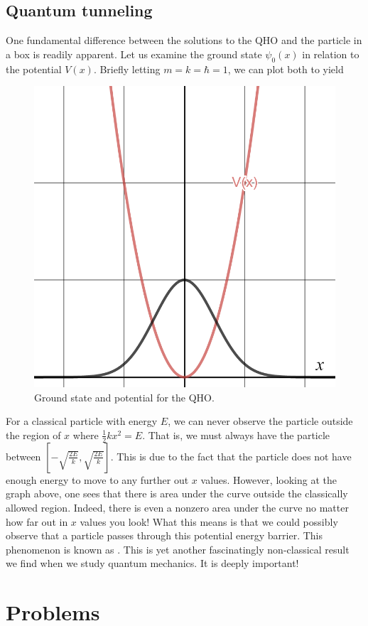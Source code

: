 \subsection{Quantum tunneling}
One fundamental difference between the solutions to the QHO and the particle in a box is readily apparent.  Let us examine the ground state $\psi_0(x)$ in relation to the potential $V(x)$.  Briefly letting $m = k = \hbar = 1$, we can plot both to yield
\begin{figure}[H]
    \centering
    \includegraphics[width=.6\textwidth]{Figures_Part_2/qho_ground_state.png}
    \caption{Ground state and potential for the QHO.}
\end{figure}
For a classical particle with energy $E$, we can never observe the particle outside the region of $x$ where $\frac{1}{2}kx^2=E$. That is, we must always have the particle between $\left[ -\sqrt{\frac{2E}{k}}, \sqrt{\frac{2E}{k}}\right]$.  This is due to the fact that the particle does not have enough energy to move to any further out $x$ values. However, looking at the graph above, one sees that there is area under the curve outside the classically allowed region.  Indeed, there is even a nonzero area under the curve no matter how far out in $x$ values you look! What this means is that we could possibly observe that a particle passes through this potential energy barrier.  This phenomenon is known as  . This is yet another fascinatingly non-classical result we find when we study quantum mechanics.  It is deeply important!

\section*{Problems}

